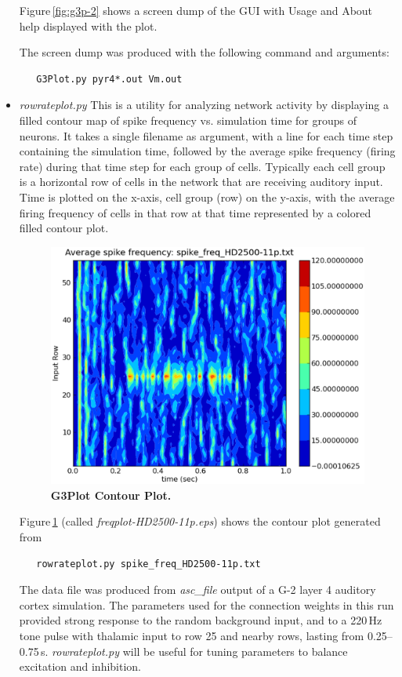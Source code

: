 \documentclass[12pt]{article}
\begin{document}
\begin{itemize}
Figure\,\ref{fig:g3p-2} shows a screen dump of the GUI with Usage
and About help displayed with the plot.

The screen dump was produced with the following command and arguments:
\begin{verbatim}
   G3Plot.py pyr4*.out Vm.out
\end{verbatim}

\item{\it rowrateplot.py} This is a utility for analyzing network activity by
displaying a filled contour map of spike frequency vs. simulation time for
groups of neurons.  It takes a single filename as argument, with a line for
each time step containing the simulation time, followed by the average
spike frequency (firing rate) during that time step for each group of
cells.  Typically each cell group is a horizontal row of cells in the
network that are receiving auditory input.  Time is plotted on the x-axis,
cell group (row) on the y-axis, with the average firing frequency of cells
in that row at that time represented by a colored filled contour plot.

\begin{figure}[h]
  \centering
   \includegraphics[scale=0.5]{figures/freqplot-HD2500-11p.eps}
\caption{\bf G3Plot Contour Plot.}
  \label{fig:g3p-3}
\end{figure}

Figure\,\ref{fig:g3p-3} (called {\it freqplot-HD2500-11p.eps}) shows the contour plot generated from
\begin{verbatim}
   rowrateplot.py spike_freq_HD2500-11p.txt
\end{verbatim}

The data file was produced from {\it asc\_file} output of a G-2 layer 4
auditory cortex simulation.  The parameters used for the connection weights
in this run provided strong response to the random background input, and to
a 220\,Hz tone pulse with thalamic input to row 25 and nearby rows, lasting
from 0.25--0.75\,s.  {\it rowrateplot.py} will be useful for tuning
parameters to balance excitation and inhibition.

\end{itemize}
\end{document}
